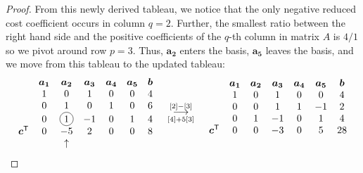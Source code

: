 \documentclass[12pt]{article}
\newcommand*\circled[1]{\tikz[baseline=(char.base)]{
            \node[shape=circle,draw,inner sep=2pt] (char) {#1};}}
\theoremstyle{definition}
\newcommand{\vect}[1]{\boldsymbol{#1}}
\newcommand{\grstep}[2][\relax]{%
   \ensuremath{\mathrel{
       {\mathop{\longrightarrow}\limits^{#2\mathstrut}_{
                                     \begin{subarray}{l} #1 \end{subarray}}}}}}
\newcommand{\tran}{\mathsf{T}}
\begin{document}
\begin{proof}
  From this newly derived tableau, we notice that the only negative reduced cost coefficient
  occurs in column $q=2$. Further, the smallest ratio between the right hand side
  and the positive coefficients of the $q$-th column in matrix $A$ is $4/1$ so we pivot
  around row $p=3$. Thus, $\vect{a_2}$ enters the basis, $\vect{a_5}$ leaves the basis, and we move from this tableau to the updated tableau:
  \begin{align*}
    \begin{matrix}
      & \vect{a_1} & \vect{a_2} & \vect{a_3} & \vect{a_4} & \vect{a_5} & \vect{b} \\
                       & 1 & 0 & 1 & 0 & 0 & 4 \\
                       & 0 & 1 & 0 & 1 & 0 & 6 \\
                       & 0 & \circled{1} & -1 & 0 & 1 & 4 \\
      \vect{c}^\tran & 0 & -5 & 2 & 0 & 0 & 8 \\
      & & \uparrow & & & & \\
    \end{matrix}
    \quad
    \begin{array}{c}
    \grstep[{[4] + 5[3]}]{[2] - [3]} \\
    \end{array}
    \quad
    \begin{matrix}
      & \vect{a_1} & \vect{a_2} & \vect{a_3} & \vect{a_4} & \vect{a_5} & \vect{b} \\
                       & 1 & 0 & 1 & 0 & 0 & 4 \\
                       & 0 & 0 & 1 & 1 & -1 & 2 \\
                       & 0 & 1 & -1 & 0 & 1 & 4 \\
      \vect{c}^\tran & 0 & 0 & -3 & 0 & 5 & 28 \\
      & & & & & & \\
    \end{matrix}
  \end{align*}


\end{proof}
\end{document}
